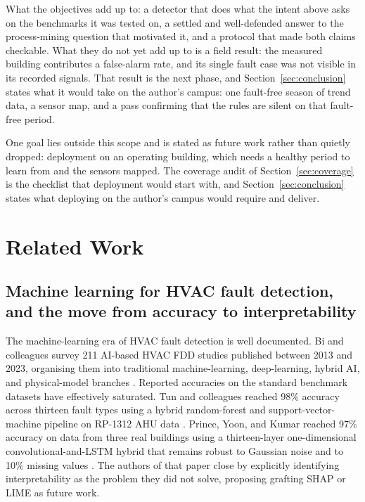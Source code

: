 \documentclass[11pt,letterpaper]{article}
\begin{document}
\noindent What the objectives add up to: a detector that does what the intent above asks on the benchmarks it was tested on, a settled and well-defended answer to the process-mining question that motivated it, and a protocol that made both claims checkable. What they do not yet add up to is a field result: the measured building contributes a false-alarm rate, and its single fault case was not visible in its recorded signals. That result is the next phase, and Section~\ref{sec:conclusion} states what it would take on the author's campus: one fault-free season of trend data, a sensor map, and a pass confirming that the rules are silent on that fault-free period.

One goal lies outside this scope and is stated as future work rather than quietly dropped: deployment on an operating building, which needs a healthy period to learn from and the sensors mapped. The coverage audit of Section~\ref{sec:coverage} is the checklist that deployment would start with, and Section~\ref{sec:conclusion} states what deploying on the author's campus would require and deliver.

\section{Related Work}
\label{sec:related}

\subsection{Machine learning for HVAC fault detection, and the move from accuracy to interpretability}

The machine-learning era of HVAC fault detection is well documented. Bi and colleagues survey 211 AI-based HVAC FDD studies published between 2013 and 2023, organising them into traditional machine-learning, deep-learning, hybrid AI, and physical-model branches \cite{bi2024aihvacreview}. Reported accuracies on the standard benchmark datasets have effectively saturated. Tun and colleagues reached 98\% accuracy across thirteen fault types using a hybrid random-forest and support-vector-machine pipeline on RP-1312 AHU data \cite{tun2021hybridrfsvm}. Prince, Yoon, and Kumar reached 97\% accuracy on data from three real buildings using a thirteen-layer one-dimensional convolutional-and-LSTM hybrid that remains robust to Gaussian noise and to 10\% missing values \cite{prince2025improved1dcnnlstm}. The authors of that paper close by explicitly identifying interpretability as the problem they did not solve, proposing grafting SHAP or LIME as future work.
\end{document}
